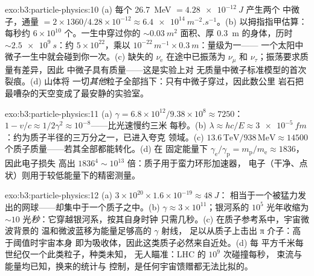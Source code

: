 \begin{solution}{exo:b3:particle-physics:10}
(a) 每个 \qty{26.7}{MeV} $= \qty{4.28e-12}{J}$ 产生两个
中微子，通量 $= 2\times1360/4.28\times10^{-12} \approx
\qty{6.4e14}{m^{-2}.s^{-1}}$。(b) 以拇指指甲估算：
每秒约 $6\times10^{10}$ 个。一生中穿过你的
${\sim}\qty{0.03}{m^2}$ 面积、厚 \qty{0.3}{m} 的身体，历时
${\sim}\qty{2.5e9}{s}$：约 $5\times10^{22}$，乘以
$10^{-22}\,\unit{m^{-1}}\times\qty{0.3}{m}$：量级为一——
一个太阳中微子一生中就会碰到你一次。(c)
缺失的 $\nu_{\text{e}}$ 在途中已振荡为 $\nu_\mu$ 和
$\nu_\tau$；振荡要求质量有差异，因此
中微子具有质量——这是实验上对
无质量中微子标准模型的首次裂痕。(d) 山体将
一切\emph{其他}粒子全部挡下：只有中微子穿过，因此数公里
岩石把最嘈杂的天空变成了最安静的实验室。
\end{solution}

\begin{solution}{exo:b3:particle-physics:11}
(a) $\gamma = 6.8\times10^{12}/9.38\times10^{8} \approx 7250$：
$1 - v/c \approx 1/2\gamma^2 \approx 10^{-8}$——比光速慢约三米
每秒。(b) $\lambda \approx hc/E \approx
\qty{3e-5}{fm}$：约为质子半径的三万分之一，已进入夸克
领域。(c) $13.6\,\text{TeV}/938\,\text{MeV} \approx
14500$ 个质子质量——若其全部都能转化。(d) 在
固定能量下 $\gamma_{\text{e}}/\gamma_{\text{p}} =
m_{\text{p}}/m_{\text{e}} \approx 1836$，因此电子损失
高出 $1836^4 \sim 10^{13}$ 倍：质子用于蛮力环形加速器，
电子（干净、点状）则用于较低能量下的精密测量。
\end{solution}

\begin{solution}{exo:b3:particle-physics:12}
(a) $3\times10^{20}\times1.6\times10^{-19} \approx \qty{48}{J}$：
相当于一个被猛力发出的网球——却集中于一个质子之中。(b) $\gamma \approx
3\times10^{11}$；银河系的 $10^{5}$ 光年收缩为
${\sim}10$ 光\emph{秒}：它穿越银河系，按其自身时钟
只需几秒。(c) 在质子参考系中，宇宙微波背景的
温和微波蓝移为能量足够高的 $\gamma$ 射线，
足以从质子上击出 π 介子：高于阈值时宇宙本身
即为吸收体，因此这类质子必然来自近处。(d) 每
平方千米每世纪仅一个此类粒子，种类未知，
无人瞄准：LHC 的 $10^{9}$ 次碰撞每秒，
束流与能量均已知，换来的统计与
控制，是任何宇宙馈赠都无法比拟的。
\end{solution}

